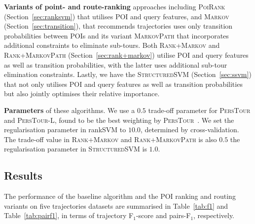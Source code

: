 {\bf Variants of point- and route-ranking} approaches including \textsc{PoiRank} (Section~\ref{sec:ranksvm})
that utilises POI and query features, 
and \textsc{Markov} (Section~\ref{sec:transition}), 
that recommends trajectories uses only transition probabilities between POIs  
and its variant \textsc{MarkovPath} that incorporates additional constraints to eliminate sub-tours.
Both \textsc{Rank+Markov} and \textsc{Rank+MarkovPath} (Section~\ref{sec:rank+markov})
utilise POI and query features as well as transition probabilities, with the latter uses
additional sub-tour elimination constraints.
Lastly, we have the \textsc{StructuredSVM} (Section~\ref{sec:ssvm}) that not only utilises POI and query features 
as well as transition probabilities but also jointly optimises their relative importance.

{\bf Parameters} of these algorithms.
We use a $0.5$ trade-off parameter for \textsc{PersTour} and \textsc{PersTour-L},
found to be the best weighting by \textsc{PersTour}~\cite{ijcai15}. 
We set the regularisation parameter in rankSVM to  $10.0$, determined by cross-validation.
The trade-off value in \textsc{Rank+Markov} and \textsc{Rank+MarkovPath} is also $0.5$
the regularisation parameter in \textsc{StructuredSVM} is $1.0$.


\subsection{Results}
\label{sec:result}
\secmoveup

The performance of the baseline algorithm and the POI ranking and routing variants 
on five trajectories datasets are summarised in Table~\ref{tab:f1}
and Table~\ref{tab:pairf1}, in terms of trajectory F$_1$-score and pairs-F$_1$, respectively.


